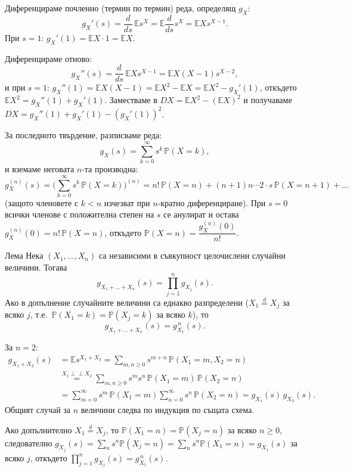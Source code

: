 \begin{proofbox}
Диференцираме почленно (термин по термин) реда, определящ $g_X$:
\[
  g_X'(s) = \frac{d}{ds}\,\mathbb Es^X = \mathbb E\frac{d}{ds}s^X = \mathbb EXs^{X-1}.
\]
При $s=1$: $g_X'(1)=\mathbb EX\cdot1=\mathbb EX$.

Диференцираме отново:
\[
  g_X''(s) = \frac{d}{ds}\,\mathbb EXs^{X-1} = \mathbb EX(X-1)s^{X-2},
\]
и при $s=1$: $g_X''(1)=\mathbb EX(X-1)=\mathbb EX^2-\mathbb EX =
\mathbb EX^2-g_X'(1)$, откъдето $\mathbb EX^2 = g_X''(1)+g_X'(1)$.
Заместваме в $DX=\mathbb EX^2-(\mathbb EX)^2$ и получаваме
$DX=g_X''(1)+g_X'(1)-(g_X'(1))^2$.

За последното твърдение, разписваме реда:
\[
  g_X(s) = \sum_{k=0}^{\infty} s^k\,\mathbb P(X=k),
\]
и вземаме неговата $n$-та производна:
\[
  g_X^{(n)}(s) = \Big(\sum_{k=0}^{\infty}s^k\,\mathbb P(X=k)\Big)^{(n)} = n!\,\mathbb P(X=n) + (n{+}1)n\cdots2\cdot s\,\mathbb P(X=n{+}1) + \dots
\]
(защото членовете с $k<n$ изчезват при $n$-кратно диференциране).
При $s=0$ всички членове с положителна степен на $s$ се анулират и
остава $g_X^{(n)}(0) = n!\,\mathbb P(X=n)$, откъдето
$\mathbb P(X=n) = \dfrac{g_X^{(n)}(0)}{n!}$. \qedbg
\end{proofbox}

\begin{thmbox}[]{Лема}
Нека $(X_1,\dots,X_n)$ са независими в съвкупност целочислени
случайни величини. Тогава
\[
  g_{X_1+\dots+X_n}(s) = \prod_{j=1}^{n} g_{X_j}(s).
\]
Ако в допълнение случайните величини са еднакво разпределени
($X_1\stackrel{d}{=}X_j$ за всяко $j$, т.е.\ $\mathbb P(X_1=k)=
\mathbb P(X_j=k)$ за всяко $k$), то
\[
  g_{X_1+\dots+X_n}(s) = g_{X_1}^{\,n}(s).
\]
\end{thmbox}

\begin{proofbox}
За $n=2$:
\begin{align*}
  g_{X_1+X_2}(s) &= \mathbb Es^{X_1+X_2} = \sum_{m,n\ge0} s^{m+n}\,\mathbb P(X_1=m,X_2=n)\\
  &\overset{X_1\perp\!\!\!\perp X_2}{=} \sum_{m,n\ge0} s^m s^n\,\mathbb P(X_1=m)\,\mathbb P(X_2=n)\\
  &= \sum_{m=0}^{\infty} s^m\,\mathbb P(X_1=m) \sum_{n=0}^{\infty} s^n\,\mathbb P(X_2=n) = g_{X_1}(s)\,g_{X_2}(s).
\end{align*}
Общият случай за $n$ величини следва по индукция по същата схема.

Ако допълнително $X_1\stackrel{d}{=}X_j$, то $\mathbb P(X_1=n)=
\mathbb P(X_j=n)$ за всяко $n\ge0$, следователно $g_{X_j}(s)=
\sum_n s^n\mathbb P(X_j=n) = \sum_n s^n\mathbb P(X_1=n)=g_{X_1}(s)$
за всяко $j$, откъдето $\prod_{j=1}^n g_{X_j}(s) = g_{X_1}^{\,n}(s)$.
\qedbg
\end{proofbox}

